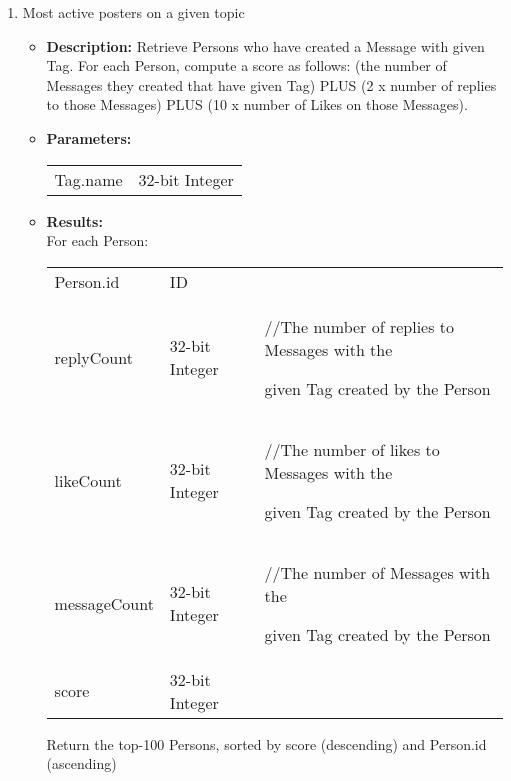 {\begin{enumerate}
      \item Most active posters on a given topic 
            \begin{itemize}
                \item \textbf{Description:}
                  Retrieve Persons who have created a Message with given Tag.  For each Person, compute a score as
                  follows: (the number of Messages they created that have given Tag) PLUS (2 x number of replies to
                  those Messages) PLUS (10 x number of Likes on those Messages).
                \item \textbf{Parameters:} \\
                    \begin{tabular}{ll}
                      Tag.name & 32-bit Integer 
                    \end{tabular}
                \item \textbf{Results:} \\
                  For each Person:
                    \begin{tabular}{lll}
                      Person.id & ID & \\
                      replyCount & 32-bit Integer & \parbox[t]{20cm}{ //The number of replies to Messages with
                        the \par given Tag created by the Person \strut}  \\
                      likeCount & 32-bit Integer & \parbox[t]{20cm}{ //The number of likes to Messages with
                        the \par given Tag created by the Person \strut}  \\ 
                      messageCount & 32-bit Integer & \parbox[t]{20cm}{ //The number of Messages with
                        the \par given Tag created by the Person \strut}  \\
                      score & 32-bit Integer & \\
                    \end{tabular}
                    Return the top-100 Persons, sorted by score (descending) and Person.id (ascending)
                    \end{itemize}


\end{enumerate}}
